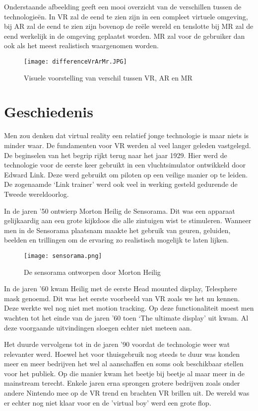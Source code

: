 Onderstaande afbeelding geeft een mooi overzicht van de verschillen tussen de technologieën. In VR zal de eend te zien zijn in een compleet virtuele omgeving, bij AR zal de eend te zien zijn bovenop de reële wereld en tenslotte bij MR zal de eend werkelijk in de omgeving geplaatst worden. MR zal voor de gebruiker dan ook als het meest realistisch waargenomen worden.

\begin{figure}[h]
	\centering
	\texttt{[image: differenceVrArMr.JPG]}
	\caption{Visuele voorstelling van verschil tussen VR, AR en MR}
\end{figure}

\section{Geschiedenis}

Men zou denken dat virtual reality een relatief jonge technologie is maar niets is minder waar. De fundamenten voor VR werden al veel langer geleden vastgelegd. De beginselen van het begrip rijkt terug naar het jaar 1929. Hier werd de technologie voor de eerste keer gebruikt in een vluchtsimulator ontwikkeld door Edward Link. Deze werd gebruikt om piloten op een veilige manier op te leiden. De zogenaamde ‘Link trainer’ werd ook veel in werking gesteld gedurende de Tweede wereldoorlog.


In de jaren ’50 ontwierp Morton Heilig de Sensorama. Dit was een apparaat gelijkaardig aan een grote kijkdoos die alle zintuigen wist te stimuleren. Wanneer men in de Sensorama plaatsnam maakte het gebruik van geuren, geluiden, beelden en trillingen om de ervaring zo realistisch mogelijk te laten lijken. 

\begin{figure}[h]
	\centering
	\texttt{[image: sensorama.png]}
	\caption{De sensorama ontworpen door Morton Heilig}
\end{figure}

In de jaren ’60 kwam Heilig met de eerste Head mounted display, Telesphere mask genoemd. Dit was het eerste voorbeeld van VR zoals we het nu kennen. Deze werkte wel nog niet met motion tracking.
Op deze functionaliteit moest men wachten tot het einde van de jaren ’60 toen ‘The ultimate display’ uit kwam.
Al deze voorgaande uitvindingen sloegen echter niet meteen aan.

Het duurde vervolgens tot in de jaren ’90 voordat de technologie weer wat relevanter werd. Hoewel het voor thuisgebruik nog steeds te duur was konden meer en meer bedrijven het wel al aanschaffen en soms ook beschikbaar stellen voor het publiek. Op die manier kwam het beetje bij beetje al maar meer in de mainstream terecht. Enkele jaren erna sprongen grotere bedrijven zoals onder andere Nintendo mee op de VR trend en brachten VR brillen uit. De wereld was er echter nog niet klaar voor en de 'virtual boy' werd een grote flop. 

